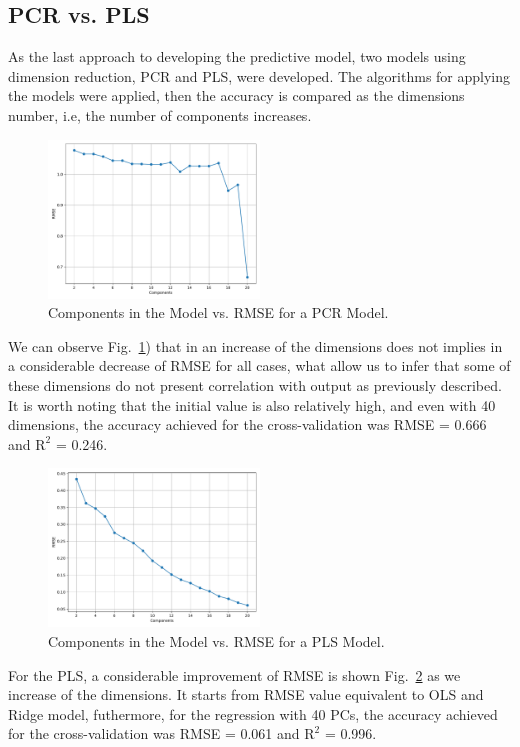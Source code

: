 \subsection{PCR vs. PLS}

As the last approach to developing the predictive model, two models using dimension reduction, PCR and PLS, were developed. The algorithms for applying the models were applied, then the accuracy is compared as the dimensions number, i.e, the number of components increases.

\begin{figure}[htbp!]
  \centerline{\includegraphics[width=0.5\textwidth]{../../code/hw2/figures/5-PCR-RMSE.pdf}}
  \caption{Components in the Model vs. RMSE for a PCR Model.}
  \label{fig:5-PCR-RMSE}
\end{figure}

We can observe Fig.~\ref{fig:5-PCR-RMSE}) that in an increase of the dimensions does not implies in a considerable decrease of RMSE for all cases, what allow us to infer that some of these dimensions do not present correlation with output as previously described. It is worth noting that the initial value is also relatively high, and even with 40 dimensions, the accuracy achieved for the cross-validation was RMSE = 0.666 and $\text{R}^2$ = 0.246.

\begin{figure}[htbp!]
  \centerline{\includegraphics[width=0.5\textwidth]{../../code/hw2/figures/5-PLS-RMSE.pdf}}
  \caption{Components in the Model vs. RMSE for a PLS Model.}
  \label{fig:5-PLS-RMSE}
\end{figure}

For the PLS, a considerable improvement of RMSE is shown Fig.~\ref{fig:5-PLS-RMSE} as we increase of the dimensions. It starts from RMSE value equivalent to OLS and Ridge model, futhermore, for the regression with 40 PCs, the accuracy achieved for the cross-validation was RMSE = 0.061 and $\text{R}^2$ = 0.996.

